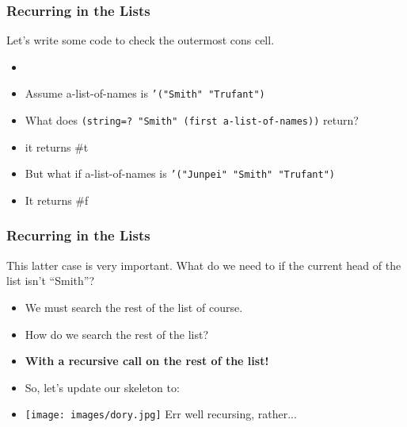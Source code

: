 \documentclass{beamer}
\begin{document}

\begin{frame}
  \frametitle{Recurring in the Lists}
  Let's write some code to check the outermost cons cell.
  \begin{itemize}
  \item<2-> \CheckSmith
  \item<3-> Assume a-list-of-names is \texttt{'("Smith" "Trufant")}
  \item<4-> What does \texttt{(string=? "Smith" (first a-list-of-names))} return?
  \item<5-> it returns \#t
  \item<6-> But what if a-list-of-names is \texttt{'("Junpei" "Smith" "Trufant")}
  \item<7-> It returns \#f
  \end{itemize}
\end{frame}


\begin{frame}
  \frametitle{Recurring in the Lists}
  This latter case is very important. What do we need to if the current head of the list  isn't ``Smith''?
  \begin{itemize}
  \item<2-> We must search the rest of the list of course.
  \item<3-> How do we search the rest of the list?
  \item<4-> \textbf{With a recursive call on the rest of the list!}
  \item<5-> So, let's update our skeleton to:
    \SearchRest
  \item<6-> \texttt{[image: images/dory.jpg]}
    Err well recursing, rather...
  \end{itemize}
\end{frame}
\end{document}
